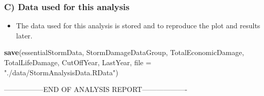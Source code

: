 \documentclass[]{article}
\newenvironment{Shaded}{\begin{snugshade}}{\end{snugshade}}
\newcommand{\KeywordTok}[1]{\textcolor[rgb]{0.13,0.29,0.53}{\textbf{{#1}}}}
\newcommand{\DataTypeTok}[1]{\textcolor[rgb]{0.13,0.29,0.53}{{#1}}}
\newcommand{\StringTok}[1]{\textcolor[rgb]{0.31,0.60,0.02}{{#1}}}
\newcommand{\NormalTok}[1]{{#1}}
\providecommand{\tightlist}{%
  \setlength{\itemsep}{0pt}\setlength{\parskip}{0pt}}
\begin{document}
\subsubsection{C) Data used for this
analysis}\label{c-data-used-for-this-analysis}

\begin{itemize}
\tightlist
\item
  The data used for this analysis is stored and to reproduce the plot
  and results later.
\end{itemize}

\begin{Shaded}
\begin{Highlighting}[]
\KeywordTok{save}\NormalTok{(essentialStormData,}
     \NormalTok{StormDamageDataGroup,}
     \NormalTok{TotalEconomicDamage,}
     \NormalTok{TotalLifeDamage,}
     \NormalTok{CutOffYear,}
     \NormalTok{LastYear,}
     \DataTypeTok{file =} \StringTok{"./data/StormAnalysisData.RData"}\NormalTok{)}
\end{Highlighting}
\end{Shaded}

-----------------END OF ANALYSIS REPORT-------------------
\end{document}
